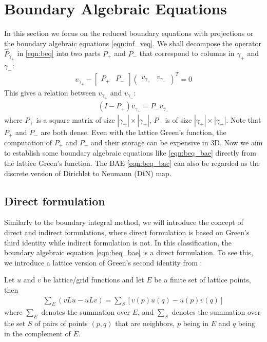 \section{Boundary Algebraic Equations}\label{sec:bae}
In this section we focus on the reduced boundary equations with projections or the boundary algebraic equations \eqref{eqn:inf_veq}. We shall decompose the operator $\widehat{P}_{\gamma_+} $ in \eqref{eqn:beq} into two parts $P_+$ and $P_{-}$ that correspond to columns in $\gamma_+$ and $\gamma_-$:
\begin{align}
v_{\gamma_+} - \left[\begin{array}{cc}P_+ & P_-\end{array}\right]\left(\begin{array}{cc}v_{\gamma_+} & v_{\gamma_-}\end{array}\right)^T = 0
\end{align}
This gives a relation between $v_{\gamma_+}$ and $v_{\gamma_-}$:
\begin{align}
(I-P_+)v_{\gamma_+} = P_- v_{\gamma_-}\label{eqn:beq_bae}
\end{align}
where $P_+$ is a square matrix of size $|\gamma_+|\times|\gamma_+|$, $P_-$ is of size $|\gamma_+|\times|\gamma_-|$. Note that $P_+$ and $P_-$ are both dense. Even with the lattice Green's function, the computation of $P_+$ and $P_-$ and their storage can be expensive in 3D. Now we aim to establish some boundary algebraic equations like \eqref{eqn:beq_bae} directly from the lattice Green's function. The BAE \eqref{eqn:beq_bae} can also be regarded as the discrete version of Dirichlet to Neumann (DtN) map.

\subsection{Direct formulation}
Similarly to the boundary integral method, we will introduce the concept of direct and indirect formulations, where direct formulation is based on Green's third identity while indirect formulation is not. In this classification, the boundary algebraic equation \eqref{eqn:beq_bae} is a direct formulation. To see this, we introduce a lattice version of Green's second identity from \cite[Sec. 5, Lemma 1]{duffin1953discrete}:
\begin{lemma}
Let $u$ and $v$ be lattice/grid functions and let $E$ be a finite set of lattice points, then
\begin{align}
\sum_E (vLu - uLv) = \sum_S[v(p)u(q)-u(p)v(q)]
\end{align}
where $\sum_E$ denotes the summation over $E$, and $\sum_S$ denotes the summation over the set $S$ of pairs of points $(p,q)$ that are neighbors, $p$ being in $E$ and $q$ being in the complement of $E$.
\end{lemma}

